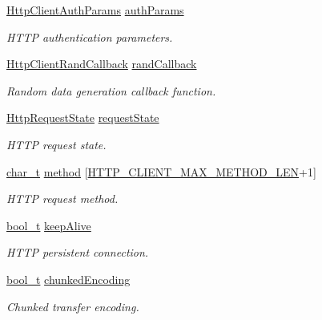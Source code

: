 \begin{DoxyCompactItemize}
\hyperlink{structHttpClientAuthParams}{Http\+Client\+Auth\+Params} \hyperlink{struct__HttpClientContext_aa9b9dd317b3e433fe2a438bc2a44e206}{auth\+Params}
\begin{DoxyCompactList}\small\item\em H\+T\+TP authentication parameters. \end{DoxyCompactList}\item 
\hyperlink{http__client_8h_a034d564bf21de50a08d13ea832881ec0}{Http\+Client\+Rand\+Callback} \hyperlink{struct__HttpClientContext_aa366e8766dd1ec821f48fda32dd550eb}{rand\+Callback}
\begin{DoxyCompactList}\small\item\em Random data generation callback function. \end{DoxyCompactList}\item 
\hyperlink{http__common_8h_a4fe74ac4ac2fba01b65f71b093977671}{Http\+Request\+State} \hyperlink{struct__HttpClientContext_a73bb481876ac7157f0000904a787488b}{request\+State}
\begin{DoxyCompactList}\small\item\em H\+T\+TP request state. \end{DoxyCompactList}\item 
\hyperlink{compiler__port_8h_a40bb5262bf908c328fbcfbe5d29d0201}{char\+\_\+t} \hyperlink{struct__HttpClientContext_a1fcb8ff4c2d18522ea680674d0762bd9}{method} \mbox{[}\hyperlink{http__client_8h_a2d6a6200e93ddfc7b7e32cfe0099dd3d}{H\+T\+T\+P\+\_\+\+C\+L\+I\+E\+N\+T\+\_\+\+M\+A\+X\+\_\+\+M\+E\+T\+H\+O\+D\+\_\+\+L\+EN}+1\mbox{]}
\begin{DoxyCompactList}\small\item\em H\+T\+TP request method. \end{DoxyCompactList}\item 
\hyperlink{compiler__port_8h_a812d16e5494522586b3784e55d479912}{bool\+\_\+t} \hyperlink{struct__HttpClientContext_a523ae58fe9bb9dc8bbbc7b398d9efb0b}{keep\+Alive}
\begin{DoxyCompactList}\small\item\em H\+T\+TP persistent connection. \end{DoxyCompactList}\item 
\hyperlink{compiler__port_8h_a812d16e5494522586b3784e55d479912}{bool\+\_\+t} \hyperlink{struct__HttpClientContext_a9e67b368673dfe95e80426aceec2fe97}{chunked\+Encoding}
\begin{DoxyCompactList}\small\item\em Chunked transfer encoding. \end{DoxyCompactList}\item 

\end{DoxyCompactItemize}
